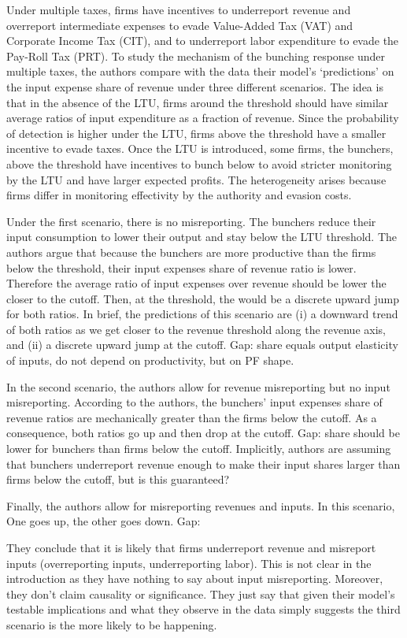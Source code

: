 \documentclass[
  12pt]{article}
\theoremstyle{definition}
\theoremstyle{remark}
\begin{document}
Under multiple taxes, firms have incentives to underreport revenue and
overreport intermediate expenses to evade Value-Added Tax (VAT) and
Corporate Income Tax (CIT), and to underreport labor expenditure to
evade the Pay-Roll Tax (PRT). To study the mechanism of the bunching
response under multiple taxes, the authors compare with the data their
model's `predictions' on the input expense share of revenue under three
different scenarios. The idea is that in the absence of the LTU, firms
around the threshold should have similar average ratios of input
expenditure as a fraction of revenue. Since the probability of detection
is higher under the LTU, firms above the threshold have a smaller
incentive to evade taxes. Once the LTU is introduced, some firms, the
bunchers, above the threshold have incentives to bunch below to avoid
stricter monitoring by the LTU and have larger expected profits. The
heterogeneity arises because firms differ in monitoring effectivity by
the authority and evasion costs.

Under the first scenario, there is no misreporting. The bunchers reduce
their input consumption to lower their output and stay below the LTU
threshold. The authors argue that because the bunchers are more
productive than the firms below the threshold, their input expenses
share of revenue ratio is lower. Therefore the average ratio of input
expenses over revenue should be lower the closer to the cutoff. Then, at
the threshold, the would be a discrete upward jump for both ratios. In
brief, the predictions of this scenario are (i) a downward trend of both
ratios as we get closer to the revenue threshold along the revenue axis,
and (ii) a discrete upward jump at the cutoff. Gap: share equals output
elasticity of inputs, do not depend on productivity, but on PF shape.

In the second scenario, the authors allow for revenue misreporting but
no input misreporting. According to the authors, the bunchers' input
expenses share of revenue ratios are mechanically greater than the firms
below the cutoff. As a consequence, both ratios go up and then drop at
the cutoff. Gap: share should be lower for bunchers than firms below the
cutoff. Implicitly, authors are assuming that bunchers underreport
revenue enough to make their input shares larger than firms below the
cutoff, but is this guaranteed?

Finally, the authors allow for misreporting revenues and inputs. In this
scenario, One goes up, the other goes down. Gap:

They conclude that it is likely that firms underreport revenue and
misreport inputs (overreporting inputs, underreporting labor). This is
not clear in the introduction as they have nothing to say about input
misreporting. Moreover, they don't claim causality or significance. They
just say that given their model's testable implications and what they
observe in the data simply suggests the third scenario is the more
likely to be happening.
\end{document}
